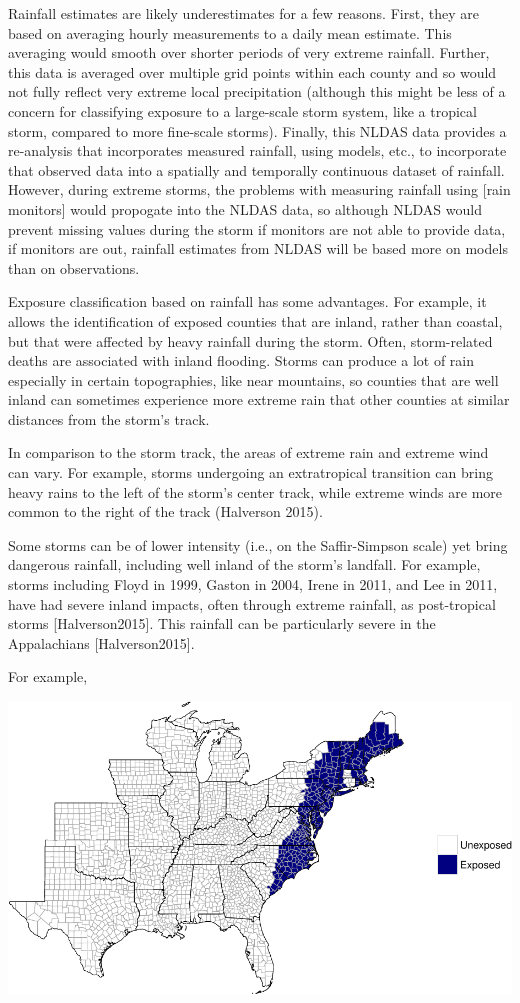 \documentclass[]{elsarticle} %
\makeatletter
\def\maxwidth{\ifdim\Gin@nat@width>\linewidth\linewidth
\else\Gin@nat@width\fi}
\let\Oldincludegraphics\includegraphics
\renewcommand{\includegraphics}[1]{\Oldincludegraphics[width=\maxwidth]{#1}}
\makeatother
\begin{document}
Rainfall estimates are likely underestimates for a few reasons. First,
they are based on averaging hourly measurements to a daily mean
estimate. This averaging would smooth over shorter periods of very
extreme rainfall. Further, this data is averaged over multiple grid
points within each county and so would not fully reflect very extreme
local precipitation (although this might be less of a concern for
classifying exposure to a large-scale storm system, like a tropical
storm, compared to more fine-scale storms). Finally, this NLDAS data
provides a re-analysis that incorporates measured rainfall, using
models, etc., to incorporate that observed data into a spatially and
temporally continuous dataset of rainfall. However, during extreme
storms, the problems with measuring rainfall using {[}rain monitors{]}
would propogate into the NLDAS data, so although NLDAS would prevent
missing values during the storm if monitors are not able to provide
data, if monitors are out, rainfall estimates from NLDAS will be based
more on models than on observations.

Exposure classification based on rainfall has some advantages. For
example, it allows the identification of exposed counties that are
inland, rather than coastal, but that were affected by heavy rainfall
during the storm. Often, storm-related deaths are associated with inland
flooding. Storms can produce a lot of rain especially in certain
topographies, like near mountains, so counties that are well inland can
sometimes experience more extreme rain that other counties at similar
distances from the storm's track.

In comparison to the storm track, the areas of extreme rain and extreme
wind can vary. For example, storms undergoing an extratropical
transition can bring heavy rains to the left of the storm's center
track, while extreme winds are more common to the right of the track
(Halverson 2015).

Some storms can be of lower intensity (i.e., on the Saffir-Simpson
scale) yet bring dangerous rainfall, including well inland of the
storm's landfall. For example, storms including Floyd in 1999, Gaston in
2004, Irene in 2011, and Lee in 2011, have had severe inland impacts,
often through extreme rainfall, as post-tropical storms
{[}Halverson2015{]}. This rainfall can be particularly severe in the
Appalachians {[}Halverson2015{]}.

For example,

\includegraphics{DraftExposurePaper_files/figure-latex/unnamed-chunk-3-1.pdf}
\end{document}

